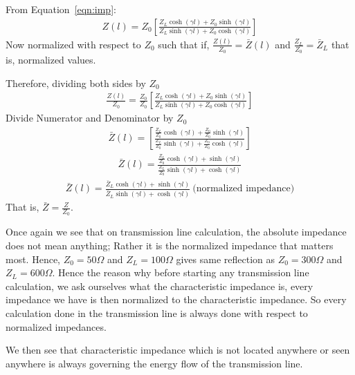 From Equation~\ref{eqn:imp}:
\begin{align*}
Z(l) = Z_0\left[\frac{Z_L\cosh(\gamma l) + Z_0\sinh(\gamma l)}{Z_L\sinh(\gamma l) + Z_0\cosh(\gamma l)}\right]
\end{align*}
Now normalized with respect to $Z_0$ such that if,
$\frac{Z(l)}{Z_0} = \bar{Z}(l)$ and $\frac{Z_L}{Z_0} =\bar{Z}_L$ that is, normalized values.

Therefore, dividing both sides by $Z_0$
\begin{align*}
\frac{Z(l)}{Z_0} = \frac{Z_0}{Z_0}[\frac{Z_L\cosh(\gamma l) + Z_0\sinh(\gamma l)}{Z_L\sinh(\gamma l) + Z_0\cosh(\gamma l)}] 
\end{align*}
Divide Numerator and Denominator by $Z_0$
\begin{align*}
\bar{Z}(l) =\left[ \frac{\frac{Z_L}{Z_0}\cosh(\gamma l) + \frac{Z_0}{Z_0}\sinh(\gamma l)}{\frac{Z_L}{Z_0}\sinh(\gamma l) + \frac{Z_0}{Z_0}\cosh(\gamma l)}\right]
\end{align*}
\begin{align*}
\bar{Z}(l) = \frac{\frac{Z_L}{Z_0}\cosh(\gamma l) + \sinh(\gamma l)}{\frac{Z_L}{Z_0}\sinh(\gamma l) + \cosh(\gamma l)}
\end{align*}
\begin{align}
\bar{Z}(l) = \frac{\bar{Z}_L\cosh(\gamma l) + \sinh(\gamma l)}{\bar{Z}_L\sinh(\gamma l) + \cosh(\gamma l)}\ \text{(normalized impedance)}
\end{align} 
That is, $\bar{Z} = \frac{Z}{Z_0}$.

Once again we see that on transmission line calculation, the absolute impedance does not mean anything; Rather it is the normalized impedance that matters most. Hence, $Z_0 = 50\Omega$ and $Z_L = 100\Omega$ gives same reflection as $Z_0 = 300\Omega$ and $Z_L =600\Omega$. Hence the reason why before starting any transmission line calculation, we ask ourselves what the characteristic impedance is, every impedance we have is then normalized to the characteristic impedance. So every calculation done in the transmission line is always done with respect to normalized impedances.

We then see that characteristic impedance which is not located anywhere or seen anywhere is always governing the energy flow of the transmission line.

